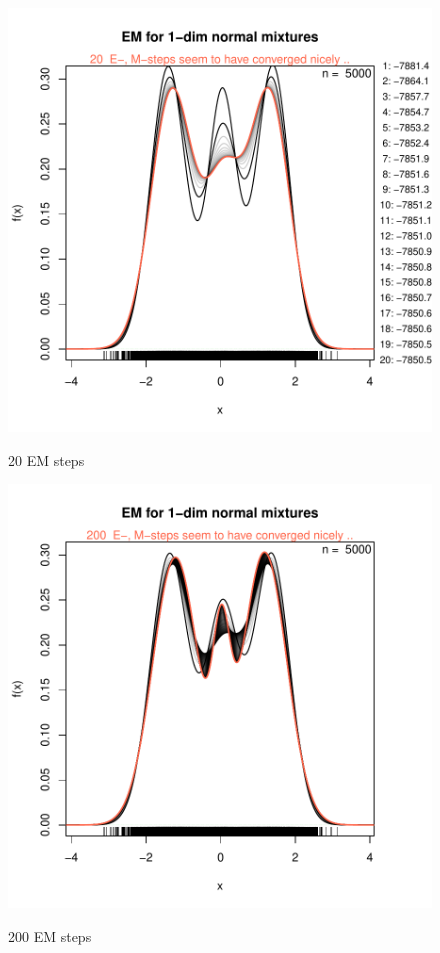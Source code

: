 \begin{figure}[h]
    \centering
    \begin{minipage}{0.45\textwidth}
    \centering
\includegraphics{chapter1-fignor1mixEx}
    \label{fig:20em}
    \caption{20 EM steps}
    \end{minipage}\hfill
    \begin{minipage}{0.45\textwidth}
    \centering
\includegraphics{chapter1-figplotemsteps}
    \label{fig:200em}
    \caption{200 EM steps}
    \end{minipage}
    \label{adfafdafds}
\end{figure}

